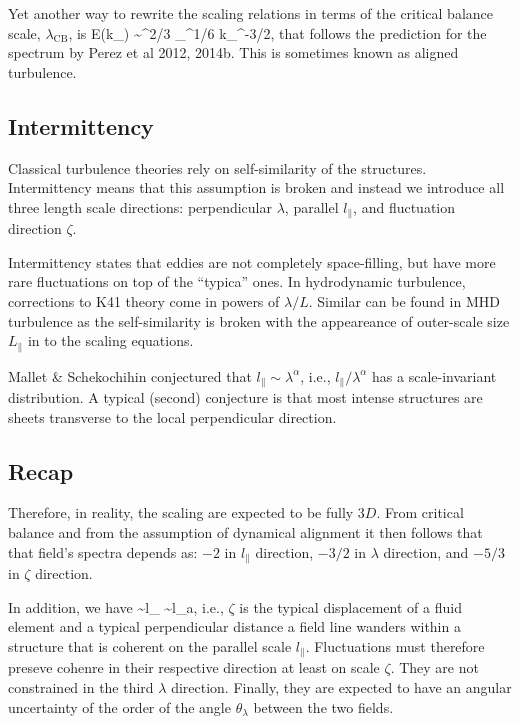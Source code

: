 \documentclass{aa}
\begin{document}
Yet another way to rewrite the scaling relations in terms of the critical balance scale, $\lambda_{\mathrm{CB}}$, is 
\be
E(k_\perp) \sim \epsilon^{2/3} \lambda_{}^{1/6} k_\perp^{-3/2},
\ee
that follows the prediction for the spectrum by Perez et al 2012, 2014b.
This is sometimes known as aligned turbulence.


\subsection{Intermittency}

Classical turbulence theories rely on self-similarity of the structures. 
Intermittency means that this assumption is broken and instead we introduce all three length scale directions: 
perpendicular $\lambda$, parallel $l_\parallel$, and fluctuation direction $\zeta$.

Intermittency states that eddies are not completely space-filling, but have more rare fluctuations on top of the ``typica'' ones.
In hydrodynamic turbulence, corrections to K41 theory come in powers of $\lambda/L$.
Similar can be found in MHD turbulence as the self-similarity is broken with the appeareance of outer-scale size $L_\parallel$ in to the scaling equations.

Mallet \& Schekochihin conjectured that $l_\parallel \sim \lambda^\alpha$, i.e., $l_\parallel/\lambda^\alpha$ has a scale-invariant distribution.
A typical (second) conjecture is that most intense structures are sheets transverse to the local perpendicular direction.


\subsection{Recap}

Therefore, in reality, the scaling are expected to be fully $3D$.
From critical balance and from the assumption of dynamical alignment it then follows that that field's spectra depends as:
$-2$ in $l_\parallel$ direction,
$-3/2$ in $\lambda$ direction, and
$-5/3$ in $\zeta$ direction.

In addition, we have
\be
\zeta \sim l_\parallel {} \sim l_\parallel {}a,
\ee
i.e., $\zeta$ is the typical displacement of a fluid element and a typical perpendicular distance a field line wanders within a structure that is coherent on the parallel scale $l_\parallel$.
Fluctuations must therefore preseve cohenre in their respective direction at least on scale $\zeta$.
They are not constrained in the third $\lambda$ direction.
Finally, they are expected to have an angular uncertainty of the order of the angle $\theta_\lambda$ between the two fields.
\end{document}
